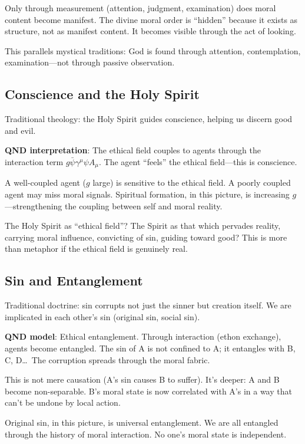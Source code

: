 \documentclass[12pt]{article}
\begin{document}
Only through measurement (attention, judgment, examination) does moral content become manifest. The divine moral order is ``hidden'' because it exists as structure, not as manifest content. It becomes visible through the act of looking.

This parallels mystical traditions: God is found through attention, contemplation, examination---not through passive observation.

\subsection{Conscience and the Holy Spirit}

Traditional theology: the Holy Spirit guides conscience, helping us discern good and evil.

\textbf{QND interpretation}: The ethical field couples to agents through the interaction term $g\bar{\psi}\gamma^\mu\psi A_\mu$. The agent ``feels'' the ethical field---this is conscience.

A well-coupled agent ($g$ large) is sensitive to the ethical field. A poorly coupled agent may miss moral signals. Spiritual formation, in this picture, is increasing $g$---strengthening the coupling between self and moral reality.

The Holy Spirit as ``ethical field''? The Spirit as that which pervades reality, carrying moral influence, convicting of sin, guiding toward good? This is more than metaphor if the ethical field is genuinely real.

\subsection{Sin and Entanglement}

Traditional doctrine: sin corrupts not just the sinner but creation itself. We are implicated in each other's sin (original sin, social sin).

\textbf{QND model}: Ethical entanglement. Through interaction (ethon exchange), agents become entangled. The sin of A is not confined to A; it entangles with B, C, D\ldots\ The corruption spreads through the moral fabric.

This is not mere causation (A's sin causes B to suffer). It's deeper: A and B become non-separable. B's moral state is now correlated with A's in a way that can't be undone by local action.

Original sin, in this picture, is universal entanglement. We are all entangled through the history of moral interaction. No one's moral state is independent.
\end{document}

